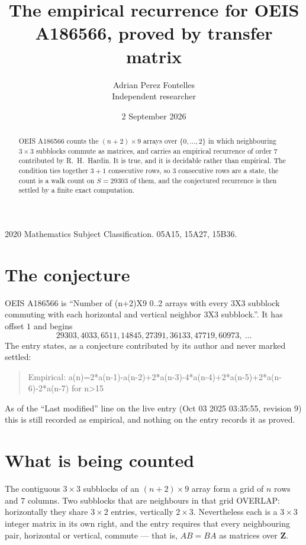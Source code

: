 \documentclass[11pt,a4paper]{article}
\title{The empirical recurrence for OEIS A186566, proved by transfer matrix}
\author{Adrian Perez Fontelles\\ \small Independent researcher}
\date{2 September 2026}
\theoremstyle{plain}
\theoremstyle{definition}
\begin{document}
\maketitle

\begin{abstract}
OEIS A186566 counts the $(n+2)\times9$ arrays over $\{0,\dots,2\}$ in which
neighbouring $3\times3$ subblocks commute as matrices, and carries an empirical
recurrence
of order $7$ contributed by R.~H.~Hardin. It is true, and it is decidable rather than
empirical. The condition ties together $3+1$ consecutive rows, so $3$ consecutive rows are
a state, the count is a walk count on $S=29303$ of them, and the conjectured recurrence is then
settled by a finite exact computation.
\end{abstract}

\noindent\small 2020 Mathematics Subject Classification. 05A15, 15A27, 15B36.\normalsize

\section{The conjecture}

OEIS A186566 is ``Number of (n+2)X9 0..2 arrays with every 3X3 subblock commuting with each horizontal and vertical neighbor 3X3 subblock.''. It has offset $1$ and begins
\[
29303, 4033, 6511, 14845, 27391, 36133, 47719, 60973,\ \dots
\]
The entry states, as a conjecture contributed by its author and never marked settled:
\begin{quote}
Empirical: a(n)=2*a(n-1)-a(n-2)+2*a(n-3)-4*a(n-4)+2*a(n-5)+2*a(n-6)-2*a(n-7) for n>15
\end{quote}
As of the ``Last modified'' line on the live entry (Oct 03 2025 03:35:55, revision 9) this is still
recorded as empirical, and nothing on the entry records it as proved.

\section{What is being counted}

The contiguous $3\times3$ subblocks of an $(n+2)\times9$ array form a grid of $n$
rows and $7$ columns. Two subblocks that are neighbours in that
grid OVERLAP: horizontally they share $3\times2$ entries, vertically
$2\times3$. Nevertheless each is a $3\times3$ integer matrix in its own right, and
the entry requires that every neighbouring pair, horizontal or vertical, commute --- that is,
$AB=BA$ as matrices over $\mathbf{Z}$.
\end{document}
